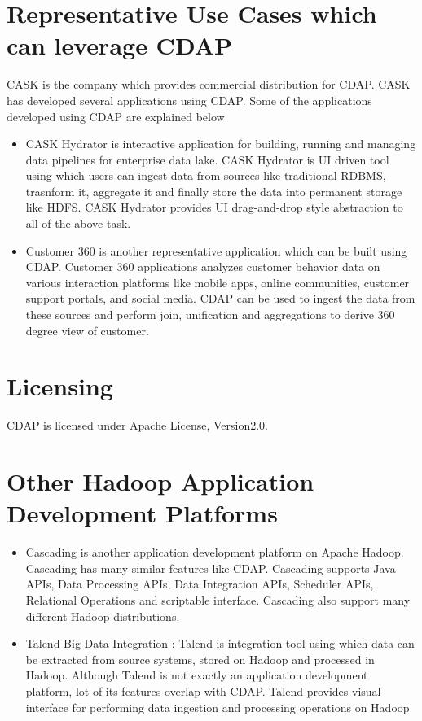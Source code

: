 \documentclass[9pt,twocolumn,twoside]{styles/osajnl}
\begin{document}
\section{Representative Use Cases which can leverage CDAP}

CASK \cite{www-cask-io} is the company which provides commercial distribution
for CDAP. CASK has developed several applications using CDAP.
Some of the applications developed using CDAP are explained below
\begin{itemize}
\item CASK Hydrator \cite{www-cask-hydrator} is interactive application for
building, running and managing data pipelines for enterprise data lake.
CASK Hydrator is UI driven tool using which users can ingest data from
sources like traditional RDBMS, trasnform it,
aggregate it and finally store the data into permanent storage like HDFS.
CASK Hydrator provides UI drag-and-drop style abstraction to all of the above
 task.
\item Customer 360 is another representative application which can be built
using CDAP. Customer 360 applications analyzes
customer behavior data on various interaction platforms like mobile apps,
online communities, customer support portals,
and social media. CDAP can be used to ingest the data from these sources and
perform join, unification and aggregations to derive 360 degree view of
customer.
\end{itemize}

\section{Licensing}
CDAP is licensed \cite{www-cdap-license}under Apache License, Version2.0.

\section{Other Hadoop Application Development Platforms}
\begin{itemize}
\item Cascading \cite{www-cascading} is another application development
platform on Apache Hadoop. Cascading has many similar features like CDAP.
Cascading supports Java APIs, Data Processing APIs, Data Integration APIs,
Scheduler APIs, Relational Operations and scriptable interface. Cascading
also support many different Hadoop distributions.

\item Talend Big Data Integration \cite{www-talend} : Talend is integration
tool using which data can be extracted from source systems, stored on Hadoop
and processed in Hadoop. Although Talend is not exactly an application
development platform, lot of its features overlap with CDAP. Talend provides
visual interface for performing data ingestion and processing operations on
Hadoop
\end{itemize}
\end{document}
